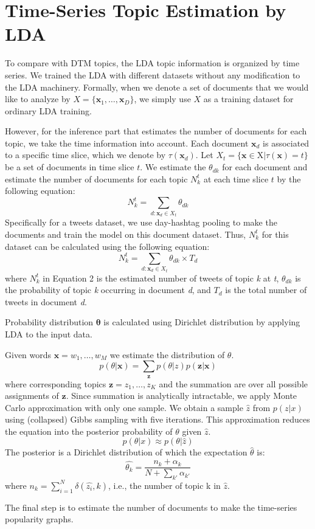 \chapter{ Time-Series Topic Estimation by LDA}
To compare with DTM topics, the LDA topic information is organized by time series. We trained the LDA with different datasets without any modification to the LDA machinery.
Formally, when we denote a set of documents that we would like to analyze by $X = \{\mathbf{x}_1, \dots, \mathbf{x}_D\}$, we simply use $X$ as a training dataset for ordinary LDA training.

However, for the inference part that estimates the number of documents for each topic, we take the time information into account.
Each document $\mathbf{x}_d$ is associated to a specific time slice, which we denote by $\tau(\mathbf{x}_d)$.
Let $X_t = \{ \mathbf{x} \in $X$ | \tau(\mathbf{x}) =  t \}$ be a set of documents in time slice $t$.
We estimate the $\theta_{dk}$ for each document and estimate the number of documents for each topic $N_k^t$ at each time slice $t$ by the following equation:
\begin{equation}
N_k^t = \sum_{d: \mathbf{x}_d \in X_t} {\theta}_{dk}
\end{equation}
Specifically for a tweets dataset, we use day-hashtag pooling to make the documents and train the model on this document dataset. Thus, $N_k^t$ for this dataset can be calculated using the following equation:
\begin{equation}
N_k^t = \sum_{d: \mathbf{x}_d \in X_t} \theta_{dk} \times T_d
\end{equation}
where $N_k^t$ in Equation 2 is the estimated number of tweets of topic \textit{k} at \textit{t}, $\theta_{dk}$ is the probability of topic \textit{k} occurring in document \textit{d}, and $T_d$ is the total number of tweets in document \textit{d}.

Probability distribution $\mathbf{\theta}$ is calculated using Dirichlet distribution by applying LDA to the input data.

Given words $ \mathbf{x} = w_1, \dots , w_M$ we estimate the distribution of $\theta$.
\begin{equation}
p(\theta|\mathbf{x}) = \sum_\mathbf{z} p(\theta|z)p(\mathbf{z}|\mathbf{x})
\end{equation}
where corresponding topics $\mathbf{z} = z_1, \dots, z_K$ and the summation are over all possible assignments of $\mathbf{z}$. Since summation is analytically intractable, we apply Monte Carlo approximation with only one sample. We obtain a sample $ \hat{z} $ from $ p(z|x) $ using (collapsed) Gibbs sampling with five iterations. This approximation reduces the equation into the posterior probability of $ \theta $ given $ \hat{z} $.
\begin{equation}
p(\theta|x) \approx p(\theta|\hat{z})
\end{equation}
The posterior is a Dirichlet distribution of which the expectation $\hat{\theta}$ is:
\begin{equation}
\hat{\theta_k} = \frac{n_k + \alpha_k}{N + \sum_{k'} \alpha_{k'}}
\end{equation}
where $ n_k = \sum_{i=1}^N \delta(\hat{z_i}, k) $, i.e., the number of topic k in $\hat{z}$.

The final step is to estimate the number of documents to make the time-series popularity graphs.